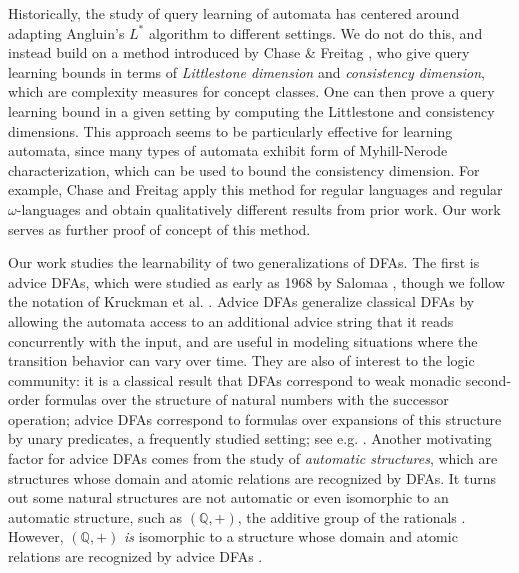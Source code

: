 \documentclass[11pt,a4paper]{amsart}
\theoremstyle{definition}
\newcommand{\bb}{\mathbb}
\begin{document}
Historically, the study of query learning of automata has centered around adapting Angluin's $L^*$ algorithm to different settings.
We do not do this, and instead build on a method introduced by Chase \& Freitag \cite{chase-freitag:bounds-in-query-learning}, who give query learning bounds in terms of \emph{Littlestone dimension} and \emph{consistency dimension}, which are complexity measures for concept classes. 
One can then prove a query learning bound in a given setting by computing the Littlestone and consistency dimensions.
This approach seems to be particularly effective for learning automata, since many types of automata exhibit form of Myhill-Nerode characterization, which can be used to bound the consistency dimension.
For example, Chase and Freitag apply this method for regular languages and regular $\omega$-languages and obtain qualitatively different results from prior work.
Our work serves as further proof of concept of this method.

Our work studies the learnability of two generalizations of DFAs. 
The first is advice DFAs, which were studied as early as 1968 by Salomaa \cite{salomaa:finite-automata-time-variant-structure}, though we follow the notation of Kruckman et al. \cite{kruckman-etal:myhill-nerode-automata-advice}.
Advice DFAs generalize classical DFAs by allowing the automata access to an additional advice string that it reads concurrently with the input, and are useful in modeling situations where the transition behavior can vary over time. 
They are also of interest to the logic community: it is a classical result that DFAs correspond to weak monadic second-order formulas over the structure of natural numbers with the successor operation; advice DFAs correspond to formulas over expansions of this structure by unary predicates, a frequently studied setting; see e.g. \cite{elgot-rabin:decidability-undecidability-extensions-of-successor,carton-thomas:monadic-theory-morphic-infinite-words,rabinovich-thomas:decidable-theories-of-natural-numbers-unary-predicates,barany:automatic-omega-words-decidable-MSO-theory}.
Another motivating factor for advice DFAs comes from the study of \emph{automatic structures}, which are structures whose domain and atomic relations are recognized by DFAs. 
It turns out some natural structures are not automatic or even isomorphic to an automatic structure, such as $(\bb Q, +)$, the additive group of the rationals \cite{tsankov:additive-group-of-rationals-not-automatic}.
However, $(\bb Q, +)$ \textit{is} isomorphic to a structure whose domain and atomic relations are recognized by advice DFAs \cite{nies:describing-groups,kruckman-etal:myhill-nerode-automata-advice}.
\end{document}
